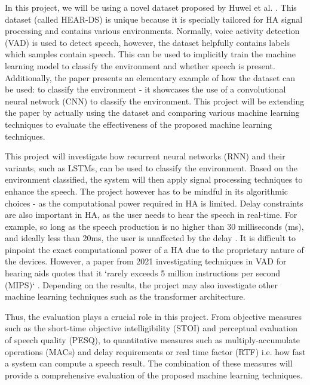 \documentclass[logo,bsc,singlespacing,parskip,online]{infthesis}
\begin{document}
In this project, we will be using a novel dataset proposed by Huwel et al. \cite{huwelHearingAidResearch2020b}.
This dataset (called HEAR-DS) is unique because it is specially tailored for HA signal processing and contains
various environments. Normally, voice activity detection (VAD) is used to
detect speech, however, the dataset helpfully contains 
labels which samples contain speech. This can be used 
to implicitly train the machine learning model to classify the environment 
and whether speech is present. Additionally, the paper presents an 
elementary example of how the dataset can be used: to classify the environment -
it showcases the use of a
convolutional neural network (CNN) to classify the environment.
This project will be extending the paper by actually using the dataset
and comparing various machine learning techniques to evaluate the
effectiveness of the proposed machine learning techniques. 

This project will investigate how recurrent neural networks (RNN) and 
their variants, such as LSTMs, can be used to classify the environment.
 Based on the environment classified, the system will then apply
signal processing techniques to enhance the speech. 
The project 
however has to be mindful in its algorithmic choices - as the computational
power required in HA is limited. Delay constraints are also
important in HA, as the user needs to hear the speech in real-time.
For example, so long as the speech production is no higher 
than 30 milliseconds (ms), and ideally less than 20ms, the user
is unaffected by the delay \cite{stoneTolerableHearingAid2002}.
It is difficult to pinpoint the exact computational power of a HA
due to the proprietary nature of the devices. However, a paper 
from 2021 investigating techniques in VAD for hearing aids 
quotes that it `rarely exceeds 5 million instructions per second (MIPS)` \cite{garcia-gomezLinearDetectorNeural2021}.
Depending on the results, the project may also investigate other machine learning
techniques such as the transformer architecture. 

Thus, the evaluation plays a crucial role in this project. From
objective measures such as the short-time objective intelligibility (STOI)
and perceptual evaluation of speech quality (PESQ), to quantitative
measures such as multiply-accumulate operations (MACs) and delay requirements or
real time factor (RTF) i.e. how fast a system can compute a speech result. 
The combination of these measures will provide a comprehensive evaluation
of the proposed machine learning techniques.
\end{document}
